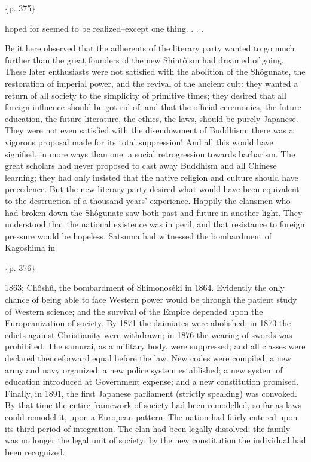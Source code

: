 \{p. 375\}

hoped for seemed to be realized--except one thing. . . .

Be it here observed that the adherents of the literary party wanted to go much further than the great founders of the new Shintôism had dreamed of going. These later enthusiasts were not satisfied with the abolition of the Shôgunate, the restoration of imperial power, and the revival of the ancient cult: they wanted a return of all society to the simplicity of primitive times; they desired that all foreign influence should be got rid of, and that the official ceremonies, the future education, the future literature, the ethics, the laws, should be purely Japanese. They were not even satisfied with the disendowment of Buddhism: there was a vigorous proposal made for its total suppression! And all this would have signified, in more ways than one, a social retrogression towards barbarism. The great scholars had never proposed to cast away Buddhism and all Chinese learning; they had only insisted that the native religion and culture should have precedence. But the new literary party desired what would have been equivalent to the destruction of a thousand years' experience. Happily the clansmen who had broken down the Shôgunate saw both past and future in another light. They understood that the national existence was in peril, and that resistance to foreign pressure would be hopeless. Satsuma had witnessed the bombardment of Kagoshima in

\{p. 376\}

1863; Chôshû, the bombardment of Shimonoséki in 1864. Evidently the only chance of being able to face Western power would be through the patient study of Western science; and the survival of the Empire depended upon the Europeanization of society. By 1871 the daimiates were abolished; in 1873 the edicts against Christianity were withdrawn; in 1876 the wearing of swords was prohibited. The samurai, as a military body, were suppressed; and all classes were declared thenceforward equal before the law. New codes were compiled; a new army and navy organized; a new police system established; a new system of education introduced at Government expense; and a new constitution promised. Finally, in 1891, the first Japanese parliament (strictly speaking) was convoked. By that time the entire framework of society had been remodelled, so far as laws could remodel it, upon a European pattern. The nation had fairly entered upon its third period of integration. The clan had been legally dissolved; the family was no longer the legal unit of society: by the new constitution the individual had been recognized.



